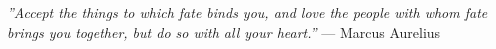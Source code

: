 \thispagestyle{empty}\mbox{}{\textheight}\mbox{}\hfill
\begin{minipage}{0.55\textwidth}%

  \textit{''Accept the things to which fate binds you, and love the people with whom fate brings you
  together, but do so with all your heart.''}
  \flushright --- Marcus Aurelius
  \normalfont
\end{minipage}
